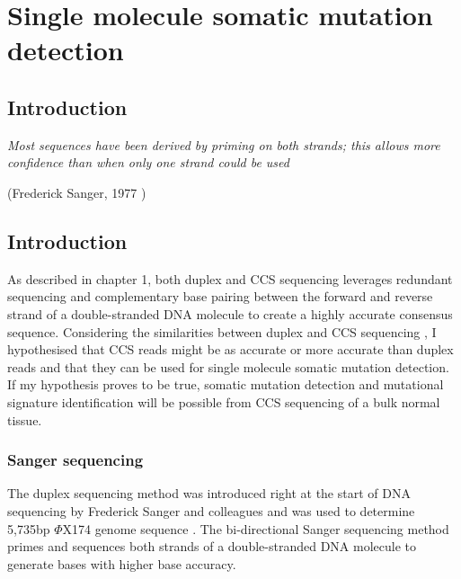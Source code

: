 
\chapter{Single molecule somatic mutation detection}

\ifpdf
    \graphicspath{{Chapter2/Figs/Raster/}{Chapter2/Figs/PDF/}{Chapter2/Figs/}}
\else
    \graphicspath{{Chapter2/Figs/Vector/}{Chapter2/Figs/}}
\fi

\section{Introduction}

\textit{Most sequences have been derived by priming on both strands; this allows more confidence than when only one strand could be used} 
\begin{flushright} (Frederick Sanger, 1977 \cite{Sanger1977-os}) \end{flushright}

\section{Introduction}

As described in chapter 1, both duplex and CCS sequencing leverages redundant sequencing and complementary base pairing between the forward and reverse strand of a double-stranded DNA molecule to create a highly accurate consensus sequence. Considering the similarities between duplex and CCS sequencing \cite{Schmitt2012-yr, Hoang2016-jx, Abascal2021-pk}, I hypothesised that CCS reads might be as accurate or more accurate than duplex reads and that they can be used for single molecule somatic mutation detection. If my hypothesis proves to be true, somatic mutation detection and mutational signature identification will be possible from CCS sequencing of a bulk normal tissue. 

\subsection{Sanger sequencing}

The duplex sequencing method was introduced right at the start of DNA sequencing by Frederick Sanger and colleagues and was used to determine 5,735bp $\Phi$X174 genome sequence \cite{Sanger1977-os}. The bi-directional Sanger sequencing method primes and sequences both strands of a double-stranded DNA molecule to generate bases with higher base accuracy. 

